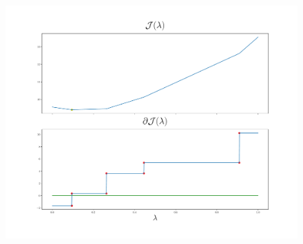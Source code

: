 \documentclass{beamer}
\begin{document}
\begin{frame}

      \begin{figure}[t!]
            \centering
            \includegraphics[width=.6\textwidth]{Chapter4/NeuroCom2021/ejemplo2_mae.pdf}
            \label{fig:sq_error}
        \end{figure}      

\end{frame}
\end{document}
